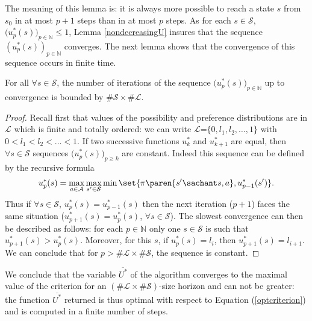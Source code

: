 The meaning of this lemma is: 
it is always more possible 
to reach a state $s$ from $s_0$ in at most $p+1$ steps 
than in at most $p$ steps.
As for each $s \in \mathcal{S}$, 
$\Big(u^*_p(s)\Big)_{p \in \mathbb{N}} \leqslant 1$, 
Lemma \ref{nondecreasingU} insures 
that the sequence $(u_p^*(s))_{p \in \mathbb{N}}$ converges. 
The next lemma shows that the convergence 
of this sequence occurs in finite time.
\begin{Lemma}
For all $\forall s \in \mathcal{S}$, 
the number of iterations of the sequence 
$\Big(u^*_p(s)\Big)_{p \in \mathbb{N}}$ up to convergence 
is bounded by $\# \mathcal{S} \times \# \mathcal{L}$.
\end{Lemma}
\begin{proof} 
Recall first that values of the possibility 
and preference distributions 
are in $\mathcal{L}$ 
which is finite 
and totally ordered: 
we can write $\mathcal{L}$=$\{ 0,l_1,l_2,\ldots,1 \}$ 
with $0 < l_1 < l_2 < \ldots < 1$. 
If two successive functions 
$u^*_k$ and $u^*_{k+1}$ are equal,
then $\forall s \in \mathcal{S}$ 
sequences $\Big(u_p^*(s)\Big)_{p \geqslant k }$ are constant. 
Indeed this sequence can be defined by the recursive formula
\[ u^*_{p}(s) = \max_{a \in \mathcal{A}} \max_{s' \in \mathcal{S}} \min \set{ \pi \paren{ s' \sachant s,a }, u^*_{p-1}(s') }. \]
Thus if $\forall s \in \mathcal{S}$, 
$u^*_p(s) = u_{p-1}^*(s)$ 
then the next iteration ($p+1$) 
faces the same situation 
($u^*_{p+1}(s) = u_{p}^*(s)$, $\forall s \in \mathcal{S}$). 
The slowest convergence can then be described as follows: 
for each $p \in \mathbb{N}$ 
only one $s \in \mathcal{S}$ 
is such that $u_{p+1}^*(s) > u^*_p(s)$. 
Moreover, for this $s$, 
if $u_p^*(s)=l_i$, 
then $u_{p+1}^*(s)=l_{i+1}$. 
We can conclude that for $p > \# \mathcal{L} \times \# \mathcal{S}$, 
the sequence is constant. 
\end{proof}
We conclude that the variable $\overline{U^*}$
of the algorithm converges 
to the maximal value of the criterion 
for an $(\# \mathcal{L} \times \# \mathcal{S})$-size horizon 
and can not be greater: 
the function $\overline{U^*}$ returned is thus optimal 
with respect to Equation (\ref{optcriterion}) 
and is computed in a finite number of steps.


